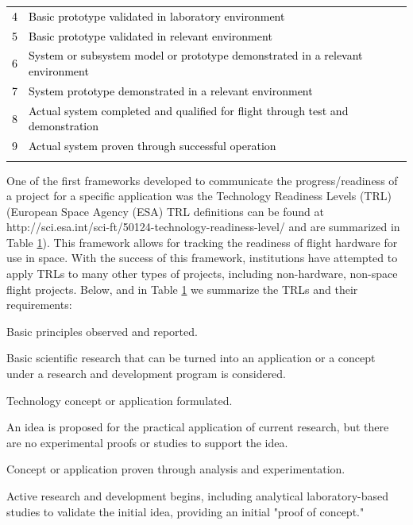 \documentclass[referee,a4paper,12pt,traditabstract]{swsc}
\begin{document}
\begin{linenumbers}
\begin{table}
\begin{tabular}{ll}
\textcolor{black}{4}& \textcolor{black}{Basic prototype validated in laboratory environment}\\
 \textcolor{black}{5} & \textcolor{black}{Basic prototype validated in relevant environment}\\ 
 \textcolor{black}{6} &\textcolor{black}{System or subsystem model or prototype demonstrated in a relevant environment} \\

 \textcolor{black}{{7}}& \textcolor{black}{{System prototype demonstrated in a relevant environment}}\\
 \textcolor{black}{{8}} & \textcolor{black}{{Actual system completed and qualified for flight through test and demonstration}}\\ 
 \textcolor{black}{{9}} &\textcolor{black}{{Actual system proven through successful operation}} \\
\label{Tab_TRL}
\end{tabular}
\end{table}

One of the first frameworks developed to communicate the progress/readiness of a project for a specific application was the Technology Readiness Levels (TRL)  \citep{mankins1995technology} (European Space Agency (ESA) TRL definitions can be found at http://sci.esa.int/sci-ft/50124-technology-readiness-level/ and are summarized in Table \ref{Tab_TRL}). This framework allows for tracking the readiness of flight hardware for use in space. With the success of this framework, institutions have attempted to apply TRLs to many other types of projects, including non-hardware, non-space flight projects. Below, and in Table \ref{Tab_TRL} we summarize the TRLs and their requirements:  

\begin{description}
{\bf \item[TRL 1 -] Basic principles observed and reported.} Basic scientific research that can be turned into an application or a concept under a research and development program is considered.

{\bf \item[TRL 2 -] Technology concept or application formulated.} An idea is proposed for the practical application of current research, but there are no experimental proofs or studies to support the idea.

{\bf \item[TRL 3 -]  Concept or application proven through analysis and experimentation.} Active research and development begins, including analytical laboratory-based studies to validate the initial idea, providing an initial "proof of concept."


\end{description}
\end{linenumbers}
\end{document}
